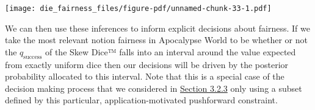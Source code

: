 \documentclass[
  letterpaper,
  DIV=11,
  numbers=noendperiod]{scrartcl}
\newenvironment{Shaded}{\begin{snugshade}}{\end{snugshade}}
\newcommand{\AttributeTok}[1]{\textcolor[rgb]{0.40,0.45,0.13}{#1}}
\newcommand{\DecValTok}[1]{\textcolor[rgb]{0.68,0.00,0.00}{#1}}
\newcommand{\FunctionTok}[1]{\textcolor[rgb]{0.28,0.35,0.67}{#1}}
\newcommand{\NormalTok}[1]{\textcolor[rgb]{0.00,0.23,0.31}{#1}}
\newcommand{\SpecialCharTok}[1]{\textcolor[rgb]{0.37,0.37,0.37}{#1}}
\newcommand{\StringTok}[1]{\textcolor[rgb]{0.13,0.47,0.30}{#1}}
\begin{document}
\begin{Shaded}
\end{Shaded}

\texttt{[image: die\_fairness\_files/figure-pdf/unnamed-chunk-33-1.pdf]}

We can then use these inferences to inform explicit decisions about
fairness. If we take the most relevant notion fairness in Apocalypse
World to be whether or not the \(q_{\mathrm{success}}\) of the Skew
Dice™ falls into an interval around the value expected from exactly
uniform dice then our decisions will be driven by the posterior
probability allocated to this interval. Note that this is a special case
of the decision making process that we considered in
\hyperref[sec:decisions]{Section 3.2.3} only using a subset defined by
this particular, application-motivated pushforward constraint.
\end{document}
